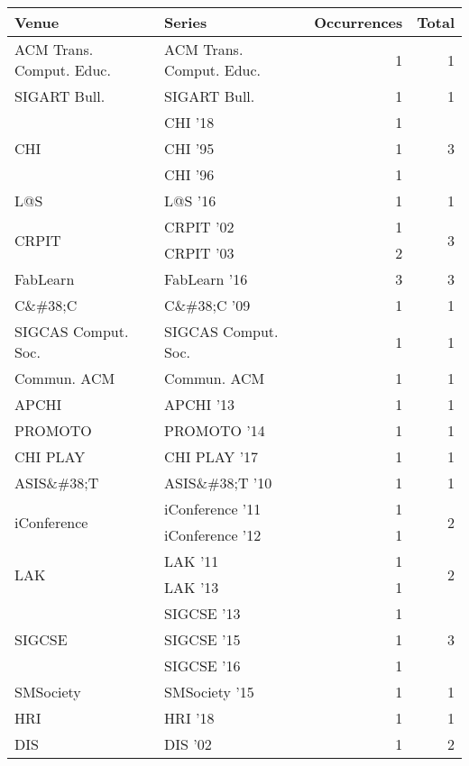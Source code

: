 \begin{table*}[t]
\begin{tabular}{llrr}
Venue & Series & Occurrences & Total\\\hline
\multirow{1}{*}{ACM Trans. Comput. Educ.} & ACM Trans. Comput. Educ. & 1 & \multirow{1}{*}{1}\\
\multirow{1}{*}{SIGART Bull.} & SIGART Bull. & 1 & \multirow{1}{*}{1}\\
\multirow{3}{*}{CHI } & CHI '18 & 1 & \multirow{3}{*}{3}\\
& CHI '95 & 1 &\\
& CHI '96 & 1 &\\
\multirow{1}{*}{L@S } & L@S '16 & 1 & \multirow{1}{*}{1}\\
\multirow{2}{*}{CRPIT } & CRPIT '02 & 1 & \multirow{2}{*}{3}\\
& CRPIT '03 & 2 &\\
\multirow{1}{*}{FabLearn } & FabLearn '16 & 3 & \multirow{1}{*}{3}\\
\multirow{1}{*}{C\&\#38;C } & C\&\#38;C '09 & 1 & \multirow{1}{*}{1}\\
\multirow{1}{*}{SIGCAS Comput. Soc.} & SIGCAS Comput. Soc. & 1 & \multirow{1}{*}{1}\\
\multirow{1}{*}{Commun. ACM} & Commun. ACM & 1 & \multirow{1}{*}{1}\\
\multirow{1}{*}{APCHI } & APCHI '13 & 1 & \multirow{1}{*}{1}\\
\multirow{1}{*}{PROMOTO } & PROMOTO '14 & 1 & \multirow{1}{*}{1}\\
\multirow{1}{*}{CHI PLAY } & CHI PLAY '17 & 1 & \multirow{1}{*}{1}\\
\multirow{1}{*}{ASIS\&\#38;T } & ASIS\&\#38;T '10 & 1 & \multirow{1}{*}{1}\\
\multirow{2}{*}{iConference } & iConference '11 & 1 & \multirow{2}{*}{2}\\
& iConference '12 & 1 &\\
\multirow{2}{*}{LAK } & LAK '11 & 1 & \multirow{2}{*}{2}\\
& LAK '13 & 1 &\\
\multirow{3}{*}{SIGCSE } & SIGCSE '13 & 1 & \multirow{3}{*}{3}\\
& SIGCSE '15 & 1 &\\
& SIGCSE '16 & 1 &\\
\multirow{1}{*}{SMSociety } & SMSociety '15 & 1 & \multirow{1}{*}{1}\\
\multirow{1}{*}{HRI } & HRI '18 & 1 & \multirow{1}{*}{1}\\
\multirow{2}{*}{DIS } & DIS '02 & 1 & \multirow{2}{*}{2}\\

\end{tabular}
\end{table*}
